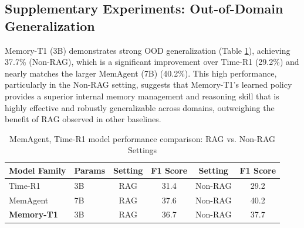 \documentclass{article} %
\begin{document}
\subsection{Supplementary Experiments: Out-of-Domain Generalization}
Memory-T1 (3B) demonstrates strong OOD generalization (Table \ref{tab:sup_ood}), achieving 37.7\% (Non-RAG), which is a significant improvement over Time-R1 (29.2\%) and nearly matches the larger MemAgent (7B) (40.2\%). This high performance, particularly in the Non-RAG setting, suggests that Memory-T1's learned policy provides a superior internal memory management and reasoning skill that is highly effective and robustly generalizable across domains, outweighing the benefit of RAG observed in other baselines.


\begin{table}[t!]
\centering
\caption{MemAgent, Time-R1 model performance comparison: RAG vs. Non-RAG Settings}
\footnotesize
\label{tab:rag_nonrag_comparison}
\begin{tabular}{@{}llcc cc@{}}
\toprule
\textbf{Model Family} & \textbf{Params} & \textbf{Setting} & \textbf{F1 Score} & \textbf{Setting} & \textbf{F1 Score} \\
\midrule
Time-R1 & 3B & RAG & 31.4 & Non-RAG & 29.2 \\
MemAgent & 7B & RAG & 37.6 & Non-RAG & 40.2 \\
\textbf{Memory-T1} & 3B & RAG & 36.7 & Non-RAG & 37.7 \\
\bottomrule
\end{tabular}
\label{tab:sup_ood}
\end{table}
\end{document}
